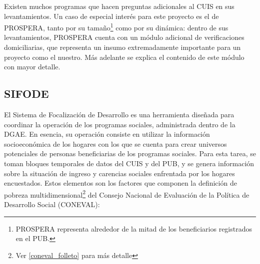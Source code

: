 \par
\noindent
Existen muchos programas que hacen preguntas adicionales al CUIS en sus levantamientos. Un caso de especial interés para este proyecto es el de PROSPERA, tanto por su tamaño\footnote{PROSPERA representa alrededor de la mitad de los beneficiarios registrados en el PUB.} como por su dinámica: dentro de sus levantamientos, PROSPERA cuenta con un módulo adicional de verificaciones domiciliarias, que representa un insumo extremadamente importante para un proyecto como el nuestro. Más adelante se explica el contenido de este módulo con mayor detalle.
\subsection*{SIFODE}
El Sistema de Focalización de Desarrollo es una herramienta diseñada para coordinar la operación de los programas sociales, administrada dentro de la DGAE. En esencia, su operación consiste en utilizar la información socioeconómica de los hogares con los que se cuenta para crear universos potenciales de personas beneficiarias de los programas sociales. Para esta tarea, se toman bloques temporales de datos del CUIS y del PUB, y se genera información sobre la situación de ingreso y carencias sociales enfrentada por los hogares encuestados. Estos elementos son los factores que componen la definición de pobreza multidimensional\footnote{Ver \ref{coneval_folleto} para más detalle} del Consejo Nacional de Evaluación de la Política de Desarrollo Social (CONEVAL):
